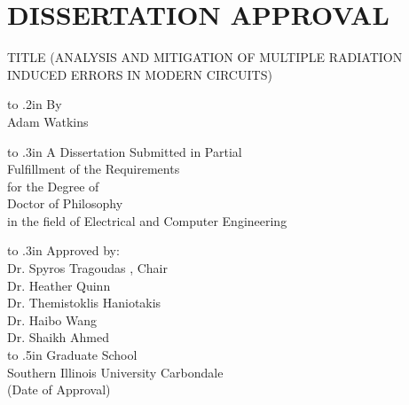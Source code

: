 

\chapter*{DISSERTATION APPROVAL} 


\thispagestyle{empty}

\begin{center}
\medskip
TITLE (ANALYSIS AND MITIGATION OF MULTIPLE RADIATION INDUCED ERRORS IN MODERN CIRCUITS)

\vbox to .2in{}
By \\
Adam Watkins

\vbox to .3in{}
A Dissertation Submitted in Partial \\
Fulfillment of the Requirements \\
for the Degree of \\
Doctor of Philosophy \\
in the field of Electrical and Computer Engineering

\vbox to .3in{}
Approved by: \\
Dr. Spyros Tragoudas , Chair \\
Dr. Heather Quinn \\
Dr. Themistoklis Haniotakis \\
Dr. Haibo Wang \\
Dr. Shaikh Ahmed \\

\baselineskip=14pt
\vbox to .5in{}
Graduate School \\
Southern Illinois University Carbondale \\
(Date of Approval)
\end{center}

\baselineskip=24pt
\newpage

